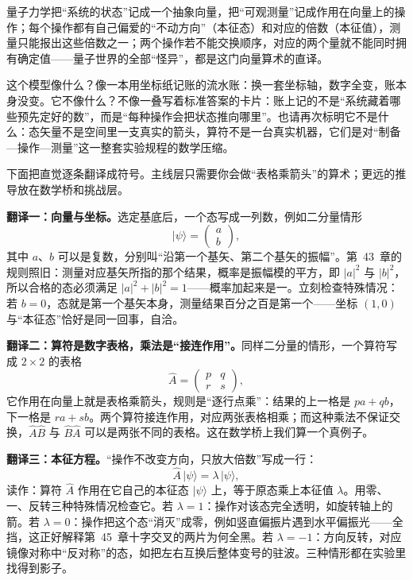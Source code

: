 
\begin{oneline}
量子力学把“系统的状态”记成一个抽象向量，把“可观测量”记成作用在向量上的操作；每个操作都有自己偏爱的“不动方向”（本征态）和对应的倍数（本征值），测量只能报出这些倍数之一；两个操作若不能交换顺序，对应的两个量就不能同时拥有确定值——量子世界的全部“怪异”，都是这门向量算术的直译。
\end{oneline}

这个模型像什么？像一本用坐标纸记账的流水账：换一套坐标轴，数字全变，账本身没变。它不像什么？不像一叠写着标准答案的卡片：账上记的不是“系统藏着哪些预先定好的数”，而是“每种操作会把状态推向哪里”。也请再次标明它不是什么：态矢量不是空间里一支真实的箭头，算符不是一台真实机器，它们是对“制备—操作—测量”这一整套实验规程的数学压缩。


下面把直觉逐条翻译成符号。主线层只需要你会做“表格乘箭头”的算术；更远的推导放在数学桥和挑战层。

\textbf{翻译一：向量与坐标。}选定基底后，一个态写成一列数，例如二分量情形
\[
|\psi\rangle=\begin{pmatrix} a \\ b \end{pmatrix},
\]
其中 $a$、$b$ 可以是复数，分别叫“沿第一个基矢、第二个基矢的振幅”。第~43~章的规则照旧：测量对应基矢所指的那个结果，概率是振幅模的平方，即 $|a|^2$ 与 $|b|^2$，所以合格的态必须满足 $|a|^2+|b|^2=1$——概率加起来是一。立刻检查特殊情况：若 $b=0$，态就是第一个基矢本身，测量结果百分之百是第一个——坐标 $(1,0)$ 与“本征态”恰好是同一回事，自洽。

\textbf{翻译二：算符是数字表格，乘法是“接连作用”。}同样二分量的情形，一个算符写成 $2\times2$ 的表格
\[
\hat{A}=\begin{pmatrix} p & q \\ r & s \end{pmatrix},
\]
它作用在向量上就是表格乘箭头，规则是“逐行点乘”：结果的上一格是 $pa+qb$，下一格是 $ra+sb$。两个算符接连作用，对应两张表格相乘；而这种乘法不保证交换，$\hat{A}\hat{B}$ 与 $\hat{B}\hat{A}$ 可以是两张不同的表格。这在数学桥上我们算一个真例子。

\textbf{翻译三：本征方程。}“操作不改变方向，只放大倍数”写成一行：
\[
\hat{A}\,|\psi\rangle=\lambda\,|\psi\rangle,
\]
读作：算符 $\hat{A}$ 作用在它自己的本征态 $|\psi\rangle$ 上，等于原态乘上本征值 $\lambda$。用零、一、反转三种特殊情况检查它。若 $\lambda=1$：操作对该态完全透明，如旋转轴上的箭。若 $\lambda=0$：操作把这个态“消灭”成零，例如竖直偏振片遇到水平偏振光——全挡，这正好解释第~45~章十字交叉的两片为何全黑。若 $\lambda=-1$：方向反转，对应镜像对称中“反对称”的态，如把左右互换后整体变号的驻波。三种情形都在实验里找得到影子。


